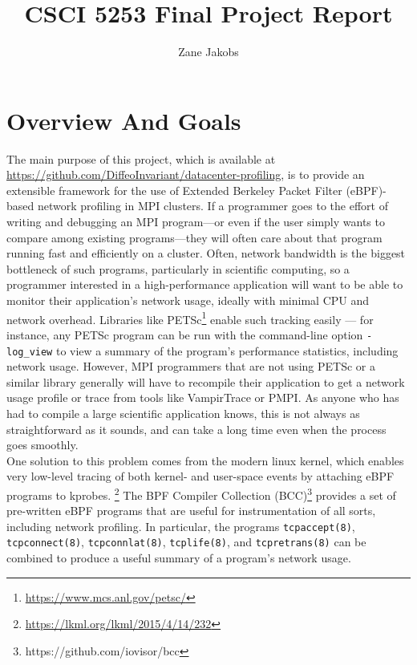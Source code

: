 \documentclass[11pt]{article}
\title{CSCI 5253 Final Project Report}
\author{Zane Jakobs}
\begin{document}
\maketitle

\section{Overview And Goals}
The main purpose of this project, which is available at \url{https://github.com/DiffeoInvariant/datacenter-profiling}, is to provide an extensible framework for the use of Extended Berkeley Packet Filter (eBPF)-based network profiling in MPI clusters. If a programmer goes to the effort of writing and debugging an MPI program---or even if the user simply wants to compare among existing programs---they will often care about that program running fast and efficiently on a cluster. Often, network bandwidth is the biggest bottleneck of such programs, particularly in scientific computing, so a programmer interested in a high-performance application will want to be able to monitor their application's network usage, ideally with minimal CPU and network overhead. Libraries like PETSc\footnote{\url{https://www.mcs.anl.gov/petsc/}} enable such tracking easily --- for instance, any PETSc program can be run with the command-line option \lstinline{-log_view} to view a summary of the program's performance statistics, including network usage. However, MPI programmers that are not using PETSc or a similar library generally will have to recompile their application to get a network usage profile or trace from tools like VampirTrace or PMPI. As anyone who has had to compile a large scientific application knows, this is not always as straightforward as it sounds, and can take a long time even when the process goes smoothly. \\
One solution to this problem comes from the modern linux kernel, which enables very low-level tracing of both kernel- and user-space events by attaching eBPF programs to kprobes. \footnote{\url{https://lkml.org/lkml/2015/4/14/232}} The BPF Compiler Collection (BCC)\footnote{https://github.com/iovisor/bcc} provides a set of pre-written eBPF programs that are useful for instrumentation of all sorts, including network profiling. In particular, the programs \lstinline{tcpaccept(8)}, \lstinline{tcpconnect(8)}, \lstinline{tcpconnlat(8)}, \lstinline{tcplife(8)}, and \lstinline{tcpretrans(8)} can be combined to produce a useful summary of a program's network usage. \\
\end{document}
